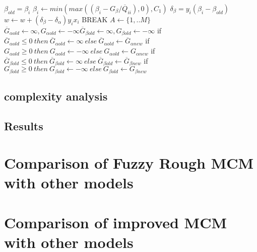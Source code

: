 \begin{algorithm}
\begin{algorithmic}
                \State $\beta_{old} = \beta_i$
                \State $\beta_i \gets min(max((\beta_i - G_\beta/\overline{Q}_{ii}),0),C_1)$
                \State $\delta_\beta = y_i(\beta_i - \beta_{old})$
            \EndIf
                \State $w \gets  w + (\delta_\beta-\delta_\alpha)y_ix_i$
            \EndIf      
    	\EndFor
        \State BREAK
        \Else
        \State $A \gets \{1,..M\}$
        \State $\overline{G}_{\alpha old} \gets \infty , G_{\alpha old} \gets -\infty
        \overline{G}_{\beta old} \gets \infty , G_{\beta old} \gets -\infty$
        \EndIf
        \EndIf
        \State if $\overline{G}_{\alpha old} \leq 0 \:then\: \overline{G}_{\alpha old} \gets \infty \:else\: \overline{G}_{\alpha old} \gets \overline{G}_{\alpha new}$
    	\State if $G_{\alpha old} \geq 0 \:then\: G_{\alpha old} \gets -\infty \:else\: G_{\alpha old} \gets G_{\alpha new}$
    	\State if $\overline{G}_{\beta old} \leq 0 \:then\: \overline{G}_{\beta old} \gets \infty \:else\: \overline{G}_{\beta old} \gets \overline{G}_{\beta new}$
    	\State if $G_{\beta old} \geq 0 \:then\: G_{\beta old} \gets -\infty \:else\: G_{\beta old} \gets G_{\beta new}$
	\EndWhile
	\EndProcedure
\end{algorithmic}
\end{algorithm}


\subsection{complexity analysis}
\subsection{Results}

\section{Comparison of Fuzzy Rough MCM with other models}


\section{Comparison of improved MCM with other models}


